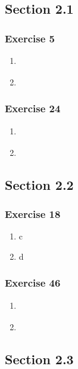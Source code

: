 \documentclass[a4paper]{article}
\newcommand{\ex}[1]{\subsubsection*{#1}}
\begin{document}
\pagestyle{fancy} %



\vspace{2em}
\subsection*{Section 2.1}
\vspace{1em}

\ex{Exercise 5}
\begin{enumerate}[label=\alph*)]
    \item{
    }

    \item{
    }
\end{enumerate}


\ex{Exercise 24}
\begin{enumerate}[label=\alph*)]
    \item{
    }

    \item{
    }
\end{enumerate}



\vspace{2em}
\subsection*{Section 2.2}
\vspace{1em}

\ex{Exercise 18}
\begin{enumerate}[label=\alph*)]
    \item{ c
    }

    \item{ d
    }
\end{enumerate}


\ex{Exercise 46}
\begin{enumerate}[label=\alph*)]
    \item{
    }

    \item{
    }
\end{enumerate}



\vspace{2em}
\subsection*{Section 2.3}
\vspace{1em}
\end{document}
